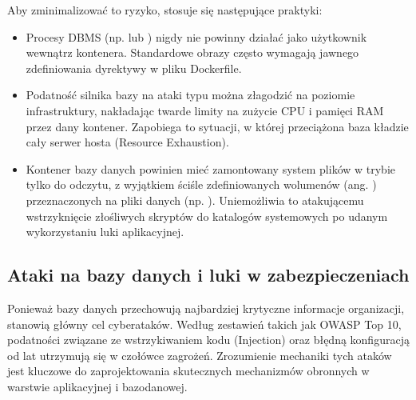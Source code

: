 \documentclass[a4paper,11pt,english,openany,oneside]{sphinxmanual}
\begin{document}
\sphinxAtStartPar
Aby zminimalizować to ryzyko, stosuje się następujące praktyki:
\begin{itemize}
\item {} 
\sphinxAtStartPar
{} Procesy DBMS (np.  lub ) nigdy nie powinny działać jako użytkownik  wewnątrz kontenera. Standardowe obrazy często wymagają jawnego zdefiniowania dyrektywy  w pliku Dockerfile.

\item {} 
\sphinxAtStartPar
{} Podatność silnika bazy na ataki typu  można złagodzić na poziomie infrastruktury, nakładając twarde limity na zużycie CPU i pamięci RAM przez dany kontener. Zapobiega to sytuacji, w której przeciążona baza kładzie cały serwer hosta (Resource Exhaustion).

\item {} 
\sphinxAtStartPar
{} Kontener bazy danych powinien mieć zamontowany system plików w trybie tylko do odczytu, z wyjątkiem ściśle zdefiniowanych wolumenów (ang. ) przeznaczonych na pliki danych (np. ). Uniemożliwia to atakującemu wstrzyknięcie złośliwych skryptów do katalogów systemowych po udanym wykorzystaniu luki aplikacyjnej.

\end{itemize}

\sphinxstepscope


\subsection{Ataki na bazy danych i luki w zabezpieczeniach}
\label{\detokenize{rozdzial_2/rozdzial_27/rozdzial_2:ataki-na-bazy-danych-i-luki-w-zabezpieczeniach}}\label{\detokenize{rozdzial_2/rozdzial_27/rozdzial_2::doc}}
\sphinxAtStartPar
Ponieważ bazy danych przechowują najbardziej krytyczne informacje organizacji, stanowią główny cel cyberataków. Według zestawień takich jak OWASP Top 10, podatności związane ze wstrzykiwaniem kodu (Injection) oraz błędną konfiguracją od lat utrzymują się w czołówce zagrożeń. Zrozumienie mechaniki tych ataków jest kluczowe do zaprojektowania skutecznych mechanizmów obronnych w warstwie aplikacyjnej i bazodanowej.
\end{document}
